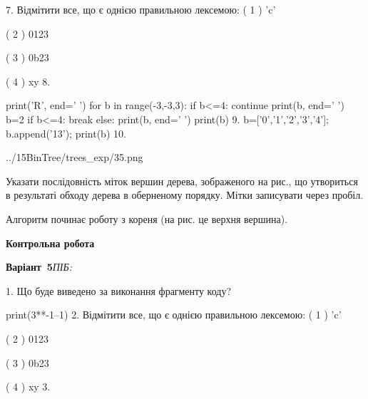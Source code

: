 \documentclass[11pt]{article}
\begin{document}
\vspace{5mm}
7. %
Відмітити все, що є однією правильною лексемою:
( 1 ) 'c'

( 2 ) 0123

( 3 ) 0b23

( 4 ) xy
\vspace{5mm}
8. 

print('R', end=' ')
for b in range(-3,-3,3):
    if b<=4:
        continue
        print(b, end=' ')
        b=2
    if b<=4:
        break
    else:
        print(b, end=' ')
    print(b)
\vspace{5mm}
9. 
b=['0','1','2','3','4']; b.append('13'); print(b)\vspace{5mm}
10. 

\begin{center}
	{../15BinTree/trees_exp/35.png}
\end{center}
Указати послідовність міток вершин дерева, зображеного на рис., що утвориться в результаті обходу дерева в оберненому порядку. Мітки записувати через пробіл.\par Алгоритм починає роботу з кореня (на рис. це верхня вершина).
\vspace{5mm}










\newpage

\newpage

{\large\textbf{Контрольна робота}}

\textbf{Варіант \No\,5}\hfill \textit{ПІБ:}\,\underline{\hspace{60mm}}
\vspace{4mm}

1. Що буде виведено за виконання фрагменту коду?

print(3**-1--1)
\vspace{5mm}
2. %
Відмітити все, що є однією правильною лексемою:
( 1 ) 'c'

( 2 ) 0123

( 3 ) 0b23

( 4 ) xy
\vspace{5mm}
3. 
\end{document}
